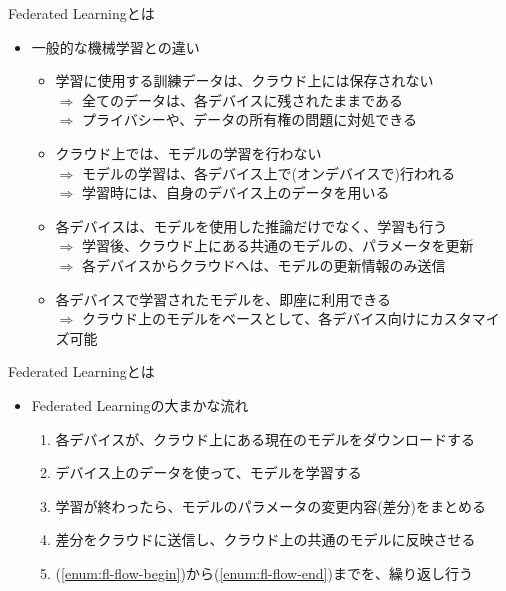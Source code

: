 \documentclass[dvipdfmx,notheorems,t]{beamer}
\begin{document}
\begin{frame}{Federated Learningとは}

\begin{itemize}
	\item 一般的な機械学習との違い
	\begin{itemize}
		\item 学習に使用する訓練データは、クラウド上には保存されない \\
		$\Rightarrow$ 全てのデータは、各デバイスに残されたままである \\
		$\Rightarrow$ \alert{プライバシー}や、データの所有権の問題に対処できる
		\newline
		
		\item クラウド上では、モデルの学習を行わない \\
		$\Rightarrow$ モデルの学習は、各デバイス上で(\alert{オンデバイス}で)行われる \\
		$\Rightarrow$ 学習時には、自身のデバイス上のデータを用いる
		\newline
		
		\item 各デバイスは、モデルを使用した推論だけでなく、学習も行う \\
		$\Rightarrow$ 学習後、クラウド上にある共通のモデルの、パラメータを更新 \\
		$\Rightarrow$ 各デバイスからクラウドへは、モデルの更新情報のみ送信
		\newline
		
		\item 各デバイスで学習されたモデルを、即座に利用できる \\
		$\Rightarrow$ クラウド上のモデルをベースとして、各デバイス向けにカスタマイズ可能
	\end{itemize}
\end{itemize}

\end{frame}

\begin{frame}{Federated Learningとは}

\begin{itemize}
	\item Federated Learningの大まかな流れ
	\begin{enumerate}
		\item 各デバイスが、クラウド上にある現在のモデルをダウンロードする \label{enum:fl-flow-begin}
		\newline
		\item デバイス上のデータを使って、モデルを学習する
		\newline
		\item 学習が終わったら、モデルのパラメータの変更内容(差分)をまとめる
		\newline
		\item 差分をクラウドに送信し、クラウド上の共通のモデルに反映させる \label{enum:fl-flow-end}
		\newline
		\item (\ref{enum:fl-flow-begin})から(\ref{enum:fl-flow-end})までを、繰り返し行う
	\end{enumerate}
\end{itemize}

\end{frame}
\end{document}
